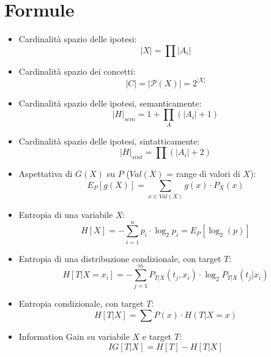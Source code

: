 \documentclass[a4paper,12pt, oneside]{article}
\title{}
\author{}
\date{}
\begin{document}

\newtheorem{teorema}{Teorema}
\newtheorem{definizione}{Definizione}
\newtheorem{esempio}{Esempio}
\newtheorem{corollario}{Corollario}
\newtheorem{lemma}{Lemma}
\newtheorem{osservazione}{Osservazione}
\newtheorem{nota}{Nota}
\newtheorem{esercizio}{Esercizio}

\renewcommand{\chaptermark}[1]{%
  \markboth{\chaptername
    \ \thechapter.\ #1}{}}
\renewcommand{\sectionmark}[1]{\markright{\thesection.\ #1}}
\allsectionsfont{\centering}
\section*{Formule}
\begin{itemize}
  \item Cardinalità spazio delle ipotesi:
  \[|X|=\prod |A_i|\]
  \item Cardinalità spazio dei concetti:
  \[|C|=|\mathcal{P}(X)|=2^{|X|}\]
  \item Cardinalità spazio delle ipotesi, semanticamente:
  \[|H|_{sem}=1+\prod_{A} (|A_i|+1)\]
  \item Cardinalità spazio delle ipotesi, sintatticamente:
  \[|H|_{sint}=\prod (|A_i|+2)\]
  \item Aspettativa di $G(X)$ su $P$ ($Val(X)$ = range di valori di $X$):
  \[E_P[g(X)]=\sum_{x\in Val(X)} g(x)\cdot P_X(x)\]
  \item Entropia di una variabile $X$:
  \[H[X]=-\sum_{i=1}^n p_i\cdot\log_2 p_i=E_P[\log_2(p)]\]
  \item Entropia di una distribuzione condizionale, con target $T$:
  \[H[T|X=x_i]=-\sum_{j=1}^m P_{T|X}(t_j,x_i)\cdot \log_2 P_{T|X}(t_j|x_i)\]
  \item Entropia condizionale, con target $T$:
  \[H[T|X]=\sum P(x)\cdot H(T|X=x)\]
  \item Information Gain su variabile $X$ e target $T$:
  \[IG[T|X]=H[T]-H[T|X]\]

\end{itemize}
\end{document}
